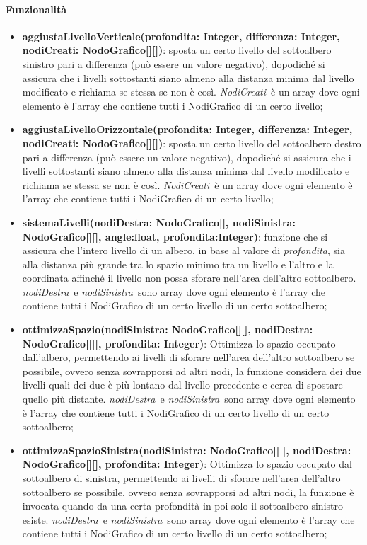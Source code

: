 \paragraph{Funzionalità}
\begin{itemize}
\item \textbf{aggiustaLivelloVerticale(profondita: Integer, differenza: Integer, nodiCreati: NodoGrafico[][])}: sposta un certo livello del sottoalbero sinistro pari a differenza (può essere un valore negativo), dopodiché si assicura che i livelli sottostanti siano almeno alla distanza minima dal livello modificato e richiama se stessa se non è così. \textit{NodiCreati}\ è un array dove ogni elemento è l'array che contiene tutti i NodiGrafico di un certo livello;
\item \textbf{aggiustaLivelloOrizzontale(profondita: Integer, differenza: Integer, nodiCreati: NodoGrafico[][])}: sposta un certo livello del sottoalbero destro pari a differenza (può essere un valore negativo), dopodiché si assicura che i livelli sottostanti siano almeno alla distanza minima dal livello modificato e richiama se stessa se non è così. \textit{NodiCreati}\ è un array dove ogni elemento è l'array che contiene tutti i NodiGrafico di un certo livello;
\item \textbf{\textbf{sistemaLivelli(nodiDestra: NodoGrafico[], nodiSinistra: NodoGrafico[][], angle:float, profondita:Integer)}}: funzione che si assicura che l'intero livello di un albero, in base al valore di \textit{profondita}, sia alla distanza più grande tra lo spazio minimo tra un livello e l'altro e la coordinata affinché il livello non possa sforare nell'area dell'altro sottoalbero. \textit{nodiDestra}\ e  \textit{nodiSinistra}\ sono array dove ogni elemento è l'array che contiene tutti i NodiGrafico di un certo livello di un certo sottoalbero;
\item \textbf{ottimizzaSpazio(nodiSinistra: NodoGrafico[][], nodiDestra: NodoGrafico[][], profondita: Integer)}: Ottimizza lo spazio occupato dall'albero, permettendo ai livelli di sforare nell'area dell'altro sottoalbero se possibile, ovvero senza sovrapporsi ad altri nodi, la funzione considera dei due livelli quali dei due è più lontano dal livello precedente e cerca di spostare quello più distante. \textit{nodiDestra}\ e  \textit{nodiSinistra}\ sono array dove ogni elemento è l'array che contiene tutti i NodiGrafico di un certo livello di un certo sottoalbero;
\item \textbf{ottimizzaSpazioSinistra(nodiSinistra: NodoGrafico[][], nodiDestra: NodoGrafico[][], profondita: Integer)}: Ottimizza lo spazio occupato dal sottoalbero di sinistra, permettendo ai livelli di sforare nell'area dell'altro sottoalbero se possibile, ovvero senza sovrapporsi ad altri nodi, la funzione è invocata quando da una certa profondità in poi solo il sottoalbero sinistro esiste. \textit{nodiDestra}\ e  \textit{nodiSinistra}\ sono array dove ogni elemento è l'array che contiene tutti i NodiGrafico di un certo livello di un certo sottoalbero;

\end{itemize}
